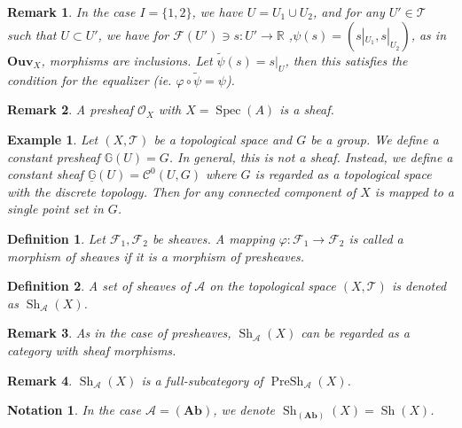 \documentclass{article}
\newtheorem{definition}{Definition}[section]
\newtheorem{notation}{Notation}[section]
\newtheorem{remark}{Remark}[section]
\newtheorem{example}{Example}[section]
\numberwithin{equation}{section}
\DeclareMathOperator{\Spec}{Spec}
\DeclareMathOperator{\PreSh}{PreSh}
\DeclareMathOperator{\Sh}{Sh}
\begin{document}
\begin{remark}
In the case $I=\{1,2\}$, we have $U=U_1\cup U_2$, and for any $U'\in\mathcal{T}$ such that $U\subset U'$, we have for $\mathcal{F}(U')\ni s:U'\to\mathbb{R}$ ,$\psi(s) = (s|_{U_1},s|_{U_2})$, as in $\mathbf{Ouv}_X$, morphisms are inclusions. Let $\tilde{\psi}(s) = s|_{U}$, then this satisfies the condition for the equalizer (ie. $\varphi\circ\tilde{\psi}=\psi$). 
\end{remark}

\begin{remark}
A presheaf $\mathcal{O}_X$ with $X=\Spec(A)$ is a sheaf.
\end{remark}

\begin{example}
Let $(X,\mathcal{T})$ be a topological space and $G$ be a group. We define a constant presheaf $\mathbb{G}(U) = G$. In general, this is not a sheaf. Instead, we define a constant sheaf $\underline{\mathbb{G}}(U) = \mathcal{C}^0(U,G)$ where $G$ is regarded as a topological space with the discrete topology. Then for any connected component of $X$ is mapped to a single point set in $G$.
\end{example}

\begin{definition}
Let $\mathcal{F}_1,\mathcal{F}_2$ be sheaves. A mapping $\varphi:\mathcal{F}_1\to\mathcal{F}_2$ is called a morphism of sheaves if it is a morphism of presheaves.
\end{definition}

\begin{definition}
A set of sheaves of $\mathcal{A}$ on the topological space $(X,\mathcal{T})$ is denoted as $\Sh_{\mathcal{A}}(X)$.
\end{definition}

\begin{remark}
As in the case of presheaves, $\Sh_\mathcal{A}(X)$ can be regarded as a category with sheaf morphisms.
\end{remark}

\begin{remark}
$\Sh_{\mathcal{A}}(X)$ is a full-subcategory of $\PreSh_{\mathcal{A}}(X)$.
\end{remark}

\begin{notation}
In the case $\mathcal{A}=(\mathbf{Ab})$, we denote $\Sh_{(\mathbf{Ab})}(X) = \Sh(X)$. 
\end{notation}
\end{document}
